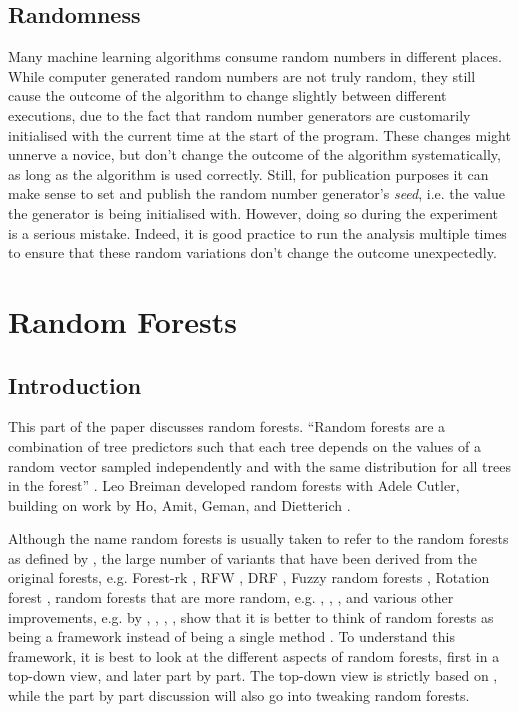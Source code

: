 \documentclass[a4paper,man,12pt,apacite,floatsintext,draftfirst]{apa6} %
\begin{document}
\subsection{Randomness}
Many machine learning algorithms consume random numbers in different places.
While computer generated random numbers are not truly random, they still
cause the outcome of the algorithm to change slightly between different
executions, due to the fact that random number generators are customarily
initialised with the current time at the start of the program.
These changes might unnerve a novice, but don't change the outcome of the
algorithm systematically, as long as the algorithm is used correctly.
Still, for publication purposes it can make sense to set and publish the
random number generator's \emph{seed}, i.e. the value the generator is being
initialised with.
However, doing so during the experiment
is a serious mistake.
Indeed, it is good practice to run the analysis multiple times to ensure
that these random variations don't change the outcome unexpectedly.

\newpage
\section{Random Forests}

\subsection{Introduction}
This part of the paper discusses random forests.
“Random forests are a combination of tree predictors such that each tree
depends on the values of a random vector sampled independently and with
the same distribution for all trees in the forest” \cite{breiman2001random}.
Leo Breiman developed random forests with Adele Cutler, building on work
by Ho, Amit, Geman, and Dietterich \cite{wpRF}.

Although the name random forests is usually taken to refer to the random
forests as defined by , the large number of
variants that have been derived from the original forests, e.g.
Forest-rk \cite{bernard2008forest}, RFW \cite{maudes2012random},
DRF \cite{bernard2012dynamic}, Fuzzy random forests \cite{bonissone2008fuzzy},
Rotation forest \cite{rodriguez2006rotation}, random forests that are
more random, e.g. , ,
, and various other improvements, e.g. by
, ,
, , show that it
is better to think of random forests as being a framework instead of being
a single method \cite{wpRF}.
To understand this framework, it is best to look at the different aspects
of random forests, first in a top-down view, and later part by part.
The top-down view is strictly based on ,
while the part by part discussion will also go into tweaking random forests.
\end{document}
